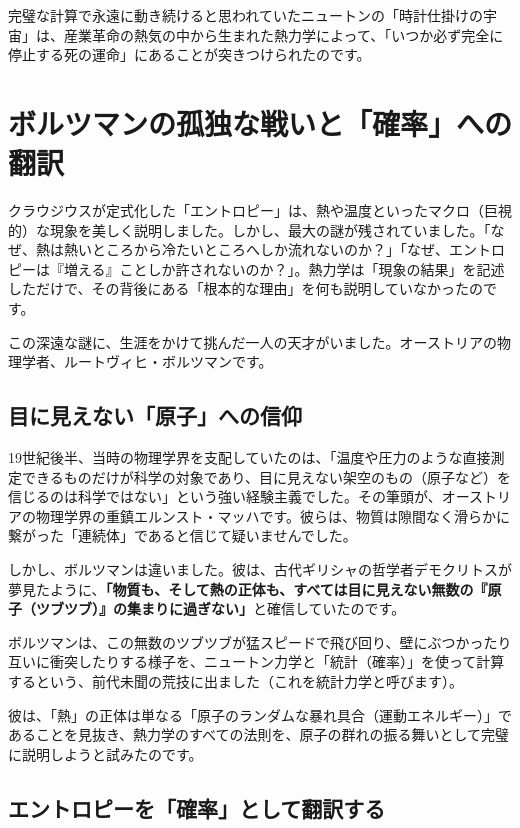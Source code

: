 完璧な計算で永遠に動き続けると思われていたニュートンの「時計仕掛けの宇宙」は、産業革命の熱気の中から生まれた熱力学によって、「いつか必ず完全に停止する死の運命」にあることが突きつけられたのです。

\section{ボルツマンの孤独な戦いと「確率」への翻訳}

クラウジウスが定式化した「エントロピー」は、熱や温度といったマクロ（巨視的）な現象を美しく説明しました。しかし、最大の謎が残されていました。「なぜ、熱は熱いところから冷たいところへしか流れないのか？」「なぜ、エントロピーは『増える』ことしか許されないのか？」。熱力学は「現象の結果」を記述しただけで、その背後にある「根本的な理由」を何も説明していなかったのです。

この深遠な謎に、生涯をかけて挑んだ一人の天才がいました。オーストリアの物理学者、ルートヴィヒ・ボルツマンです。

\subsection{目に見えない「原子」への信仰}

19世紀後半、当時の物理学界を支配していたのは、「温度や圧力のような直接測定できるものだけが科学の対象であり、目に見えない架空のもの（原子など）を信じるのは科学ではない」という強い経験主義でした。その筆頭が、オーストリアの物理学界の重鎮エルンスト・マッハです。彼らは、物質は隙間なく滑らかに繋がった「連続体」であると信じて疑いませんでした。

しかし、ボルツマンは違いました。彼は、古代ギリシャの哲学者デモクリトスが夢見たように、\textbf{「物質も、そして熱の正体も、すべては目に見えない無数の『原子（ツブツブ）』の集まりに過ぎない」}と確信していたのです。

ボルツマンは、この無数のツブツブが猛スピードで飛び回り、壁にぶつかったり互いに衝突したりする様子を、ニュートン力学と「統計（確率）」を使って計算するという、前代未聞の荒技に出ました（これを統計力学と呼びます）。

彼は、「熱」の正体は単なる「原子のランダムな暴れ具合（運動エネルギー）」であることを見抜き、熱力学のすべての法則を、原子の群れの振る舞いとして完璧に説明しようと試みたのです。

\subsection{エントロピーを「確率」として翻訳する}

